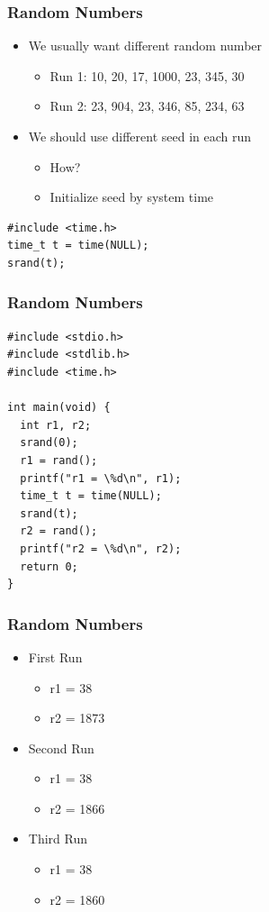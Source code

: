 \documentclass{../c-lecture}
\begin{document}
\begin{frame}[fragile]
  \frametitle{Random Numbers}
  \begin{itemize}
    \item We usually want different random number
    \begin{itemize}
      \item Run 1: 10, 20, 17, 1000, 23, 345, 30
      \item Run 2: 23, 904, 23, 346, 85, 234, 63
    \end{itemize}
    \item We should use different seed in each run
    \begin{itemize}
      \item How?
      \item Initialize seed by system time
    \end{itemize}
  \end{itemize}
  \begin{verbatim}
#include <time.h>
time_t t = time(NULL);
srand(t);
  \end{verbatim}
\end{frame}

\begin{frame}[fragile]
  \frametitle{Random Numbers}
  \begin{verbatim}
#include <stdio.h>
#include <stdlib.h>
#include <time.h>

int main(void) {
  int r1, r2;
  srand(0);
  r1 = rand();
  printf("r1 = \%d\n", r1);
  time_t t = time(NULL);
  srand(t);
  r2 = rand();
  printf("r2 = \%d\n", r2);
  return 0;
}
  \end{verbatim}
\end{frame}

\begin{frame}
  \frametitle{Random Numbers}
  \begin{itemize}
    \item First Run
    \begin{itemize}
      \item r1 = 38
      \item r2 = 1873
    \end{itemize}
    \item Second Run
    \begin{itemize}
      \item r1 = 38
      \item r2 = 1866
    \end{itemize}
    \item Third Run
    \begin{itemize}
      \item r1 = 38
      \item r2 = 1860
    \end{itemize}
  \end{itemize}
\end{frame}
\end{document}

